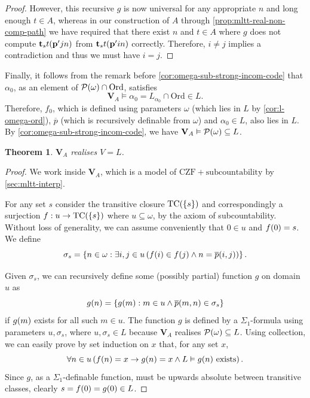\documentclass[12pt,openany]{book}
\theoremstyle{plain}
\newtheorem{theorem}{Theorem}[section]
\theoremstyle{definition}
\newcommand\opA[1]{\mathop{\forall #1}}
\newcommand\opE[1]{\mathop{\exists #1}}
\DeclareMathOperator\TC{TC}
\newcommand\Pow{\mathcal{P}}
\newcommand\CZF{\mathrm{CZF}}
\newcommand\Ord{\mathrm{Ord}}
\newcommand\bp{\mathbf{p}}
\newcommand\bt{\mathbf{t}}
\newcommand\bV{\mathbf{V}}
\begin{document}
\begin{proof}
  However, this recursive $g$ is now universal for any appropriate $n$ and long enough $t \in A$, whereas in our construction of $A$ through \autoref{prop:mltt-real-non-comp-path} we have required that there exist $n$ and $t \in A$ where $g$ does not compute $\bt_s t \mleft(\bp' jn\mright)$ from $\bt_s t \mleft(\bp' in\mright)$ correctly. Therefore, $i \neq j$ implies a contradiction and thus we must have $i = j$.
\end{proof}

Finally, it follows from the remark before \autoref{cor:omega-sub-strong-incom-code} that $\alpha_0$, as an element of $\Pow\mleft(\omega\mright) \cap \Ord$, satisfies
\[\bV_A \vDash \alpha_0 = L_{\alpha_0} \cap \Ord \in L.\]
Therefore, $f_0$, which is defined using parameters $\omega$ (which lies in $L$ by \autoref{cor:l-omega-ord}), $\overline{p}$ (which is recursively definable from $\omega$) and $\alpha_0 \in L$, also lies in $L$. By \autoref{cor:omega-sub-strong-incom-code}, we have $\bV_A \vDash \Pow\mleft(\omega\mright) \subseteq L$.

\begin{theorem}
  \label{thm:mltt-real-v-l}
  $\bV_A$ realises $V = L$.
\end{theorem}

\begin{proof}
  We work inside $\bV_A$, which is a model of $\CZF + \text{subcountability}$ by \autoref{sec:mltt-interp}.

  For any set $s$ consider the transitive closure $\TC\mleft(\left\{s\right\}\mright)$ and correspondingly a surjection $f : u \rightarrow \TC\mleft(\left\{s\right\}\mright)$ where $u \subseteq \omega$, by the axiom of subcountability. Without loss of generality, we can assume conveniently that $0 \in u$ and $f\mleft(0\mright) = s$. We define
  \[\sigma_s = \left\{n \in \omega : \opE{i, j \in u} \left(f\mleft(i\mright) \in f\mleft(j\mright) \land n = \overline{p}\mleft(i, j\mright)\right)\right\}.\]

  Given $\sigma_s$, we can recursively define some (possibly partial) function $g$ on domain $u$ as
  \[g\mleft(n\mright) = \left\{g\mleft(m\mright) : m \in u \land \overline{p}\mleft(m, n\mright) \in \sigma_s\right\}\]
  if $g\mleft(m\mright)$ exists for all such $m \in u$. The function $g$ is defined by a $\Sigma_1$-formula using parameters $u, \sigma_s$, where $u, \sigma_s \in L$ because $\bV_A$ realises $\Pow\mleft(\omega\mright) \subseteq L$. Using collection, we can easily prove by set induction on $x$ that, for any set $x$,
  \[\opA{n \in u} \left(f\mleft(n\mright) = x \rightarrow g\mleft(n\mright) = x \land L \vDash \text{$g\mleft(n\mright)$ exists}\right).\]
  Since $g$, as a $\Sigma_1$-definable function, must be upwards absolute between transitive classes, clearly $s = f\mleft(0\mright) = g\mleft(0\mright) \in L$.
\end{proof}
\end{document}
